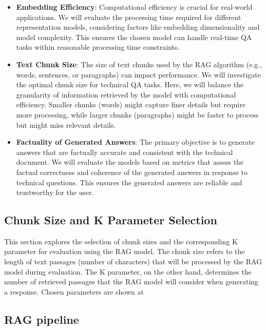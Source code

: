 \begin{itemize}
  \item \textbf{Embedding Efficiency}:
    Computational efficiency is crucial for real-world applications.
    We will evaluate the processing time required for different representation models, considering factors like embedding dimensionality and model complexity.
    This ensures the chosen model can handle real-time \ac{QA} tasks within reasonable processing time constraints.
  \item \textbf{Text Chunk Size}:
    The size of text chunks used by the \ac{RAG} algorithm (e.g., words, sentences, or paragraphs) can impact performance.
    We will investigate the optimal chunk size for technical \ac{QA} tasks.
    Here, we will balance the granularity of information retrieved by the model with computational efficiency.
    Smaller chunks (words) might capture finer details but require more processing, while larger chunks (paragraphs) might be faster to process but might miss relevant details.  
  \item \textbf{Factuality of Generated Answers}:
    The primary objective is to generate answers that are factually accurate and consistent with the technical document.
    We will evaluate the models based on metrics that assess the factual correctness and coherence of the generated answers in response to technical questions.
    This ensures the generated answers are reliable and trustworthy for the user.
\end{itemize}

\subsection{Chunk Size and K Parameter Selection}
This section explores the selection of chunk sizes and the corresponding K parameter for evaluation using the \ac{RAG} model.
The chunk size refers to the length of text passages (number of characters) that will be processed by the \ac{RAG} model during evaluation.
The K parameter, on the other hand, determines the number of retrieved passages that the \ac{RAG} model will consider when generating a response.
Chosen parameters are shown at 



\subsection{RAG pipeline}

